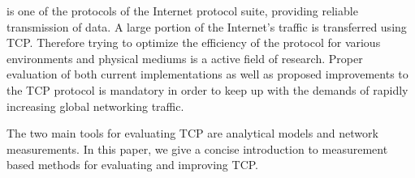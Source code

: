 
 is one of the protocols of the Internet protocol suite, providing reliable transmission of data. A large portion of the Internet's traffic is transferred using TCP. Therefore trying to optimize the efficiency of the protocol for various environments and physical mediums is a active field of research. Proper evaluation of both current implementations as well as proposed improvements to the TCP protocol is mandatory in order to keep up with the demands of rapidly increasing global networking traffic.

The two main tools for evaluating TCP are analytical models and network measurements. In this paper, we give a concise introduction to measurement based methods for evaluating and improving TCP.


